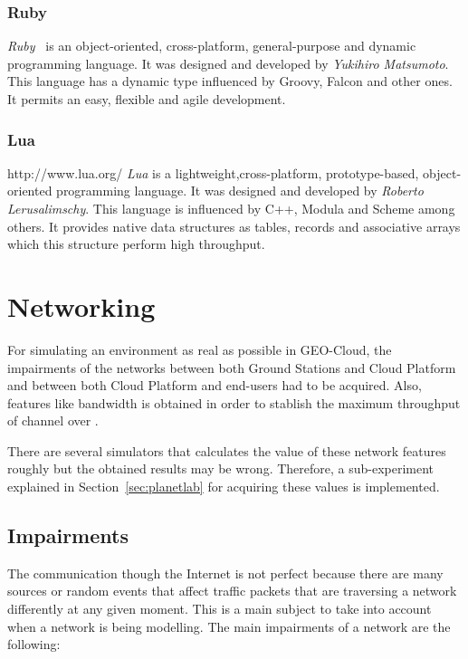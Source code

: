 \subsubsection{Ruby}
\emph{Ruby}~\cite{Community} is an object-oriented, cross-platform, general-purpose and dynamic
programming language. It was designed and developed by \emph{Yukihiro
  Matsumoto}. This language has a dynamic type influenced by Groovy, Falcon and
other ones. It permits an easy, flexible and agile development. 


\subsubsection{Lua}
http://www.lua.org/
\emph{Lua} is a lightweight,cross-platform, prototype-based, object-oriented programming
language. It was designed and developed by \emph{Roberto Lerusalimschy}. This
language is influenced by C++, Modula and Scheme among others. It provides
native data structures as tables, records and associative arrays which this
structure perform high throughput.


\section{Networking}

For simulating an environment as real as possible in GEO-Cloud, the impairments  of the networks between both Ground Stations and Cloud Platform
and between both Cloud Platform and end-users had to be acquired. Also, features
like bandwidth is obtained in order to stablish the maximum throughput of
channel over \vw.

There are several simulators that
calculates the value of these network features roughly but the obtained results
may be wrong. Therefore, a sub-experiment explained in
Section~\ref{sec:planetlab} for acquiring these values is implemented. 

\subsection{Impairments}

The communication though the Internet is not perfect because there are many
sources or random events that affect traffic packets that are traversing a
network differently at any given moment. This is a main
subject to take into account when a network is being modelling. The main
impairments
 of a network are the following:

